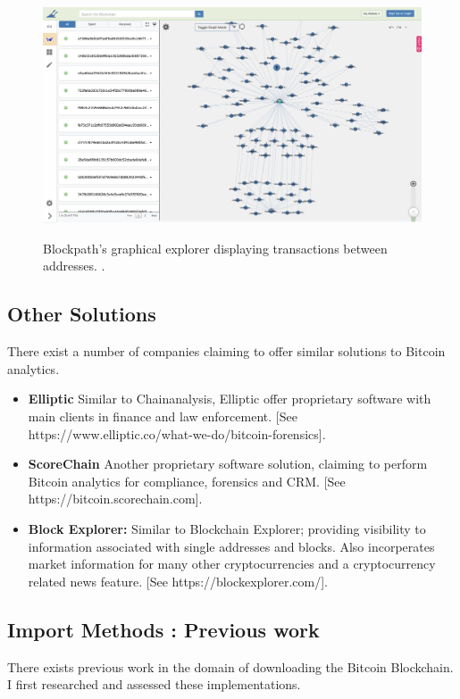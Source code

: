 \begin{figure}
  \centering
  \includegraphics[width = 15cm]{./figures/blockpath}\\[0.5cm] 
  \caption{Blockpath's graphical explorer displaying transactions between addresses. \cite{RefWorks:doc:5c4b3a0ce4b0ae05280a143b}.}
\end{figure}

\subsection{Other Solutions}

There exist a number of companies claiming to offer similar solutions to Bitcoin analytics. 

\begin{itemize}
    \item \textbf{Elliptic} Similar to Chainanalysis, Elliptic offer proprietary software with main clients in finance and law enforcement. [See https://www.elliptic.co/what-we-do/bitcoin-forensics]. 
    \item \textbf{ScoreChain} Another proprietary software solution, claiming to perform Bitcoin analytics for compliance, forensics and CRM. [See https://bitcoin.scorechain.com]. 
    \item \textbf{Block Explorer:} Similar to Blockchain Explorer; providing visibility to information associated with single addresses and blocks. Also incorperates market information for many other cryptocurrencies and a cryptocurrency related news feature. [See https://blockexplorer.com/]. 

\end{itemize}


\subsection{Import Methods : Previous work}\label{design-db-previous-work}
There exists previous work in the domain of downloading the Bitcoin Blockchain. I first researched and assessed these implementations. 

